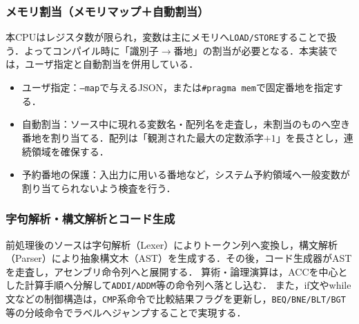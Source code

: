 \documentclass[a4paper,11pt]{ltjsarticle}
\begin{document}
\subsubsection{メモリ割当（メモリマップ＋自動割当）}
本CPUはレジスタ数が限られ，変数は主にメモリへ\texttt{LOAD/STORE}することで扱う．よってコンパイル時に「識別子$\rightarrow$番地」の割当が必要となる．本実装では，ユーザ指定と自動割当を併用している．
\begin{itemize}
    \item ユーザ指定：\texttt{--map}で与えるJSON，または\texttt{\#pragma mem}で固定番地を指定する．
    \item 自動割当：ソース中に現れる変数名・配列名を走査し，未割当のものへ空き番地を割り当てる．配列は「観測された最大の定数添字$+1$」を長さとし，連続領域を確保する．
    \item 予約番地の保護：入出力に用いる番地など，システム予約領域へ一般変数が割り当てられないよう検査を行う．
\end{itemize}

\subsubsection{字句解析・構文解析とコード生成}
前処理後のソースは字句解析（Lexer）によりトークン列へ変換し，構文解析（Parser）により抽象構文木（AST）を生成する．その後，コード生成器がASTを走査し，アセンブリ命令列へと展開する．
算術・論理演算は，ACCを中心とした計算手順へ分解して\texttt{ADDI/ADDM}等の命令列へ落とし込む．
また，if文やwhile文などの制御構造は，\texttt{CMP}系命令で比較結果フラグを更新し，\texttt{BEQ/BNE/BLT/BGT}等の分岐命令でラベルへジャンプすることで実現する．

\end{document}
